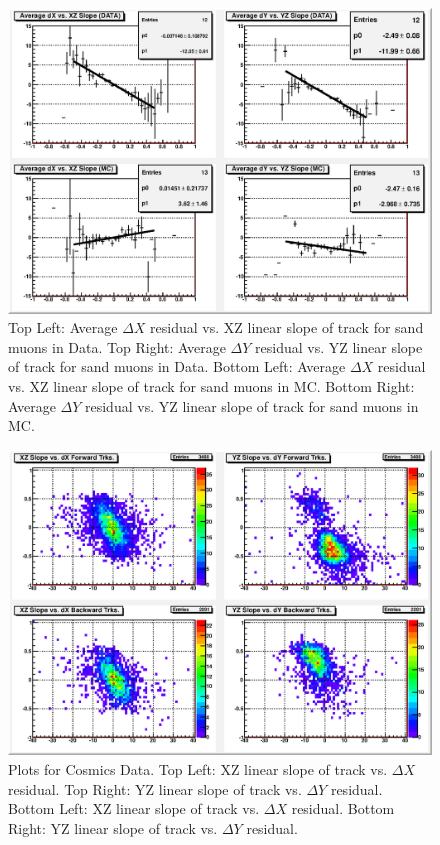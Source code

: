 \begin{figure}
  \centering
  \includegraphics[width=6in]{Figures/Appendix/cprof_SM.eps}
  \caption{Top Left: Average $\Delta X$ residual vs. XZ linear slope of track for sand muons in Data. Top Right: Average $\Delta Y$ residual vs. YZ linear slope of track for sand muons in Data. Bottom Left: Average $\Delta X$ residual vs. XZ linear slope of track for sand muons in MC. Bottom Right: Average $\Delta Y$ residual vs. YZ linear slope of track for sand muons in MC.} 
  \label{fig:cprof_SM}%
\end{figure}

\begin{figure}
  \centering
  \includegraphics[width=6in]{Figures/Appendix/cdy_data.eps}
  \caption{Plots for Cosmics Data. Top Left: XZ linear slope of track vs. $\Delta X$ residual. Top Right: YZ linear slope of track vs. $\Delta Y$ residual. Bottom Left: XZ linear slope of track vs. $\Delta X$ residual. Bottom Right: YZ linear slope of track vs. $\Delta Y$ residual.} 
  \label{fig:cdy_data}%
\end{figure}

